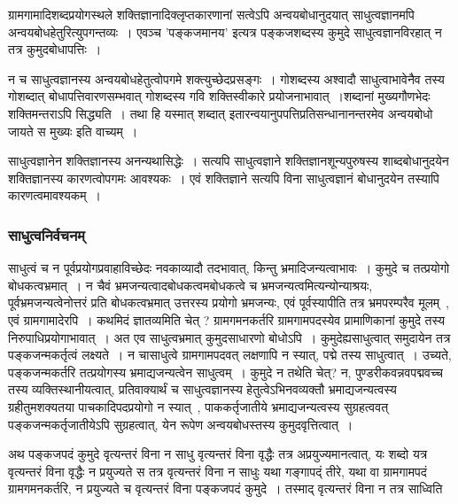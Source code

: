 				ग्रामगामादिशब्दप्रयोगस्थले शक्तिज्ञानादिक्लृप्तकारणानां सत्वेऽपि अन्वयबोधानुदयात् साधुत्वज्ञानमपि अन्वयबोधहेतुरित्युपगन्तव्यः~। एवञ्च ’पङ्कजमानय’ इत्यत्र पङ्कजशब्दस्य कुमुदे साधुत्वज्ञानविरहात् न तत्र कुमुदबोधापत्तिः~।
  
				न च साधुत्वज्ञानस्य अन्वयबोधहेतुत्वोपगमे शक्त्युच्छेदप्रसङ्गः~। गोशब्दस्य अश्वादौ साधुत्वाभावेनैव तस्य गोशब्दात् बोधापत्तिवारणसम्भवात् गोशब्दस्य गवि शक्तिस्वीकारे प्रयोजनाभावात्~।शब्दानां मुख्यगौणभेदः शक्तिमन्तराऽपि सिद्ध्यति~। तथा हि यस्मात् शब्दात् इतारन्वयानुपपत्तिप्रतिसन्धानानन्तरमेव अन्वयबोधो जायते स मुख्यः इति वाच्यम्~। 
	
				साधुत्वज्ञानेन शक्तिज्ञानस्य अनन्यथासिद्धेः~। सत्यपि साधुत्वज्ञाने शक्तिज्ञानशून्यपुरुषस्य शाब्दबोधानुदयेन शक्तिज्ञानस्य कारणत्वोपगमः आवश्यकः~। एवं शक्तिज्ञाने सत्यपि विना साधुत्वज्ञानं बोधानुदयेन तस्यापि कारणत्वमावश्यकम्~। 
			
			\subsubsection{साधुत्वनिर्वचनम्}
			
				\begin{small}
			
					साधुत्वं च न पूर्वप्रयोगप्रवाहाविच्छेदः नवकाव्यादौ तदभावात्, किन्तु भ्रमादिजन्यत्वाभावः~। कुमुदे च तत्प्रयोगो बोधकत्वभ्रमात्~।  न चैवं भ्रमजन्यत्वादबोधकत्वमबोधकत्वे च भ्रमजन्यत्वमित्यन्योन्याश्रयः, पूर्वभ्रमजन्यत्वेनोत्तरं प्रति बोधकत्वभ्रमात् उत्तरस्य प्रयोगो भ्रमजन्यः, एवं पूर्वस्यापीति तत्र भ्रमपरम्परैव मूलम्~, एवं ग्रामगामादेरपि~। कथमिदं ज्ञातव्यमिति चेत् ? ग्रामगमनकर्तरि  ग्रामगामपदस्येव प्रामाणिकानां कुमुदे तस्य निरुपाधिप्रयोगाभावात्~। अत एव साधुत्वभ्रमात् कुमुदसाधारणो बोधोऽपि~।  कुमुदेह्यसाधुत्वात् समुदायेन तत्र पङ्कजन्मकर्तृत्वं लक्ष्यते~। न चासाधुत्वे ग्रामगामपदवत् लक्षणापि न स्यात्, पद्मे तस्य साधुत्वात्~। उच्यते, पङ्कजन्मकर्तरि तत्प्रयोगस्य भ्रमाद्यजन्यत्वेन साधुत्वम्~। कुमुदे न तथेति चेत्? न, पुण्डरीकवन्नवपद्मवच्च तस्य व्यक्तिस्थानीयत्वात्, प्रतिवाक्यार्थं च साधुत्वज्ञानस्य हेतुत्वेऽभिनवव्यक्तौ भ्रमाद्यजन्यत्वस्य ग्रहीतुमशक्यतया पाचकादिपदप्रयोगो न स्यात्~, पाककर्तृजातीये भ्रमाद्यजन्यत्वस्य सुग्रहत्ववत् पङ्कजन्मकर्तृजातीयेऽपि सुग्रहत्वात्, येन रूपेण अन्वयबोधस्तस्य कुमुदवृत्तित्वात्~।           
   
					अथ पङ्कजपदं कुमुदे वृत्यन्तरं विना न साधु वृत्यन्तरं विना वृद्धैः तत्र अप्रयुज्यमानत्वात्, यः शब्दो यत्र वृत्यन्तरं विना वृद्धैः न प्रयुज्यते स तत्र वृत्यन्तरं विना न साधुः यथा गङ्गापद्ं तीरे, यथा वा ग्रामगामपदं ग्रामगमनकर्तरि, न प्रयुज्यते च वृत्यन्तरं विना पङ्कजपदं कुमुदे~। तस्माद् वृत्यन्तरं विना न तत्र साध्विति 
				\end{small}
			
